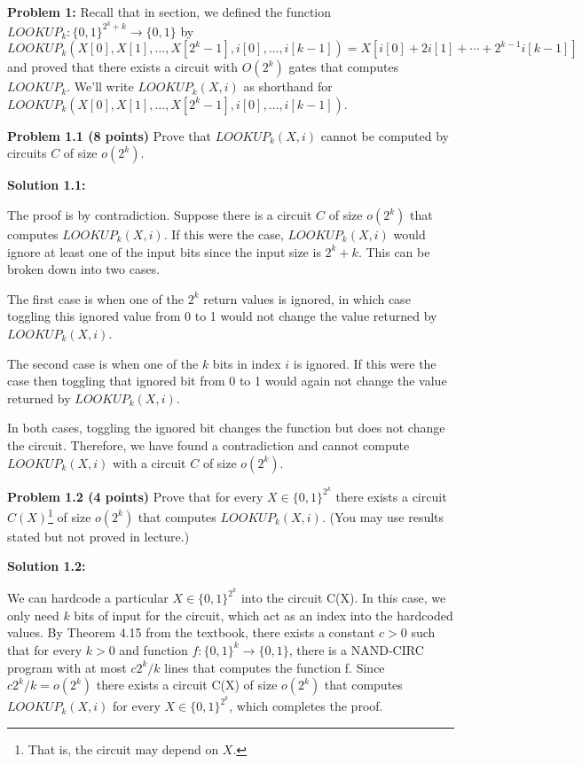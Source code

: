 \documentclass[11pt]{article}
\begin{document}
\newcommand{\N}{\mathbb{N}} 
\newcommand{\XOR}{\mathrm{XOR}} 
\newcommand{\Size}{\mathrm{SIZE}} 

\newpage

\textbf{Problem 1:}
Recall that in section, we defined the function $LOOKUP_k: \{0,1\}^{2^k + k} \to \{0,1\}$ by 
$$LOOKUP_k(X[0], X[1], \ldots, X[2^{k}-1], i[0], \ldots, i[k-1]) = X[i[0] + 2 i[1] + \cdots + 2^{k-1}i[k-1]]$$ 
and proved that there exists a circuit with $O(2^k)$ gates that computes $LOOKUP_k$. We'll write $LOOKUP_k(X, i)$ as shorthand for $LOOKUP_k(X[0], X[1], \ldots, X[2^{k}-1], i[0], \ldots, i[k-1])$.

\textbf{Problem 1.1 (8 points)} Prove that $LOOKUP_k(X,i)$ cannot be computed by circuits $C$ of size $o(2^k)$.

\textbf{Solution 1.1:}%

The proof is by contradiction. Suppose there is a circuit $C$ of size $o(2^k)$ that computes $LOOKUP_k(X,i)$. If this were the case, $LOOKUP_k(X,i)$ would ignore at least one of the input bits since the input size is $2^k + k$. This can be broken down into two cases.

The first case is when one of the $2^k$ return values is ignored, in which case toggling this ignored value from 0 to 1 would not change the value returned by $LOOKUP_k(X,i)$.

The second case is when one of the $k$ bits in index $i$ is ignored. If this were the case then toggling that ignored bit from 0 to 1 would again not change the value returned by $LOOKUP_k(X,i)$.

In both cases, toggling the ignored bit changes the function but does not change the circuit. Therefore, we have found a contradiction and cannot compute $LOOKUP_k(X,i)$ with a circuit $C$ of size $o(2^k)$.

\textbf{Problem 1.2 (4 points)} Prove that for every $X \in \{0,1\}^{2^k}$ there exists a circuit $C(X)$\footnote{That is, the circuit may depend on $X$.} of size $o(2^k)$ that computes $LOOKUP_k(X,i)$. (You may use results stated but not proved in lecture.)

\textbf{Solution 1.2:}%

We can hardcode a particular $X \in \{0,1\}^{2^k}$ into the circuit C(X). In this case, we only need $k$ bits of input for the circuit, which act as an index into the hardcoded values. By Theorem 4.15 from the textbook, there exists a constant $c > 0$ such that for every $k > 0$ and function $f: \{0, 1\}^k \to \{0, 1\}$, there is a NAND-CIRC program with at most $c2^k / k$ lines that computes the function f. Since $c2^k / k = o(2^k)$ there exists a circuit C(X) of size $o(2^k)$ that computes $LOOKUP_k(X,i)$ for every $X \in \{0,1\}^{2^k}$, which completes the proof.
\end{document}
